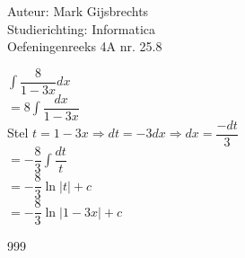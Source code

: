 \documentclass[a4paper]{article}
\newcommand{\dint}{\displaystyle\int}
\begin{document}
\noindent \large Auteur: Mark Gijsbrechts \\
\noindent \large Studierichting: Informatica\\
\noindent \large Oefeningenreeks 4A nr. 25.8\\

\medskip

\normalsize





$\dint \dfrac{8}{1-3x} dx $ \\

$= 8 \dint \dfrac{dx}{1-3x} $ \\

Stel $ t = 1 - 3x \Rightarrow dt = -3dx \Rightarrow dx = \dfrac{-dt}{3} $ \\

$= -\dfrac{8}{3} \dint \dfrac{dt}{t} $ \\

$= -\dfrac{8}{3} \ln|t| + c $ \\

$= -\dfrac{8}{3} \ln|1-3x| + c $ \\


\begin{thebibliography}{999}
\end{thebibliography}
\end{document}
